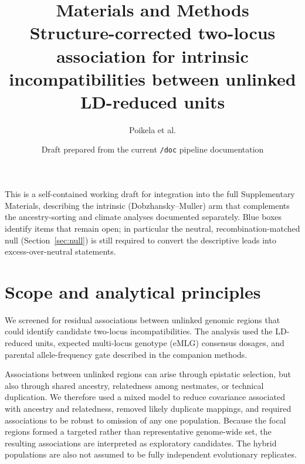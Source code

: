 \documentclass[11pt]{article}
\title{\vspace{-3em}
  \textbf{\color{Accent}Materials and Methods}\\[0.3em]
  \Large Structure-corrected two-locus association for intrinsic
  incompatibilities between unlinked LD-reduced units}
\author{Poikela et al.}
\date{\small Draft prepared from the current \texttt{/doc} pipeline documentation}
\begin{document}
\maketitle
\vspace{-1.5em}

\begin{center}
\small\color{Muted}
This is a self-contained working draft for integration into the full Supplementary
Materials, describing the intrinsic (Dobzhansky--Muller) arm that complements the
ancestry-sorting and climate analyses documented separately. Blue boxes identify items
that remain open; in particular the neutral, recombination-matched null (Section~\ref{sec:null})
is still required to convert the descriptive leads into excess-over-neutral statements.
\end{center}

\section{Scope and analytical principles}\label{sec:scope}

We screened for residual associations between unlinked genomic regions that could identify
candidate two-locus incompatibilities. The analysis used the LD-reduced units, expected
multi-locus genotype (eMLG) consensus dosages, and parental allele-frequency gate described
in the companion methods.

Associations between unlinked regions can arise through epistatic selection, but also through
shared ancestry, relatedness among nestmates, or technical duplication. We therefore used a
mixed model to reduce covariance associated with ancestry and relatedness, removed likely
duplicate mappings, and required associations to be robust to omission of any one population.
Because the focal regions formed a targeted rather than representative genome-wide set, the
resulting associations are interpreted as exploratory candidates. The hybrid populations are
also not assumed to be fully independent evolutionary replicates.
\end{document}
